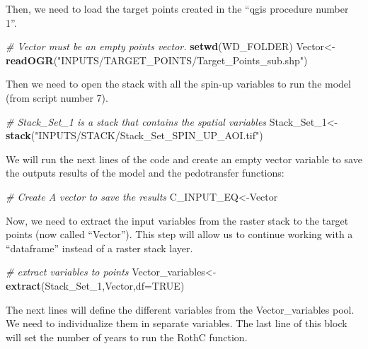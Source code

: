 \documentclass[
  10pt,
  b5paper,
]{book}
\newenvironment{Shaded}{\begin{snugshade}}{\end{snugshade}}
\newcommand{\CommentTok}[1]{\textcolor[rgb]{0.56,0.35,0.01}{\textit{#1}}}
\newcommand{\DataTypeTok}[1]{\textcolor[rgb]{0.13,0.29,0.53}{#1}}
\newcommand{\DecValTok}[1]{\textcolor[rgb]{0.00,0.00,0.81}{#1}}
\newcommand{\KeywordTok}[1]{\textcolor[rgb]{0.13,0.29,0.53}{\textbf{#1}}}
\newcommand{\NormalTok}[1]{#1}
\newcommand{\OtherTok}[1]{\textcolor[rgb]{0.56,0.35,0.01}{#1}}
\newcommand{\StringTok}[1]{\textcolor[rgb]{0.31,0.60,0.02}{#1}}
\begin{document}
Then, we need to load the target points created in the ``qgis procedure number 1''.

\begin{Shaded}
\begin{Highlighting}[]
\CommentTok{# Vector must be an empty points vector. }
\KeywordTok{setwd}\NormalTok{(WD_FOLDER)}
\NormalTok{Vector<-}\KeywordTok{readOGR}\NormalTok{(}\StringTok{"INPUTS/TARGET_POINTS/Target_Points_sub.shp"}\NormalTok{)}
\end{Highlighting}
\end{Shaded}

Then we need to open the stack with all the spin-up variables to run the model (from script number 7).

\begin{Shaded}
\begin{Highlighting}[]
\CommentTok{# Stack_Set_1 is a stack that contains the spatial variables }
\NormalTok{Stack_Set_}\DecValTok{1}\NormalTok{<-}\StringTok{ }\KeywordTok{stack}\NormalTok{(}\StringTok{"INPUTS/STACK/Stack_Set_SPIN_UP_AOI.tif"}\NormalTok{)}
\end{Highlighting}
\end{Shaded}

We will run the next lines of the code and create an empty vector variable to save the outputs results of the model and the pedotransfer functions:

\begin{Shaded}
\begin{Highlighting}[]
\CommentTok{# Create A vector to save the results}
\NormalTok{C_INPUT_EQ<-Vector}
\end{Highlighting}
\end{Shaded}

Now, we need to extract the input variables from the raster stack to the target points (now called ``Vector''). This step will allow us to continue working with a ``dataframe'' instead of a raster stack layer.

\begin{Shaded}
\begin{Highlighting}[]
\CommentTok{# extract variables to points}
\NormalTok{Vector_variables<-}\KeywordTok{extract}\NormalTok{(Stack_Set_}\DecValTok{1}\NormalTok{,Vector,}\DataTypeTok{df=}\OtherTok{TRUE}\NormalTok{)}
\end{Highlighting}
\end{Shaded}

The next lines will define the different variables from the Vector\_variables pool. We need to individualize them in separate variables. The last line of this block will set the number of years to run the RothC function.
\end{document}
